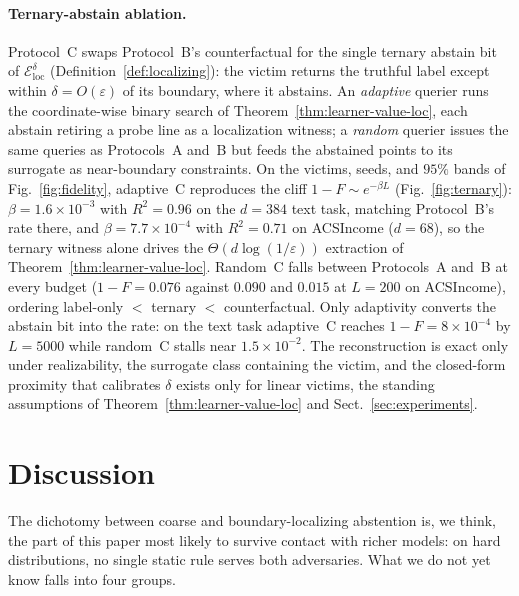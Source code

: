 \documentclass[runningheads,envcountsame]{llncs}
\newcommand{\cE}{\mathcal{E}}
\newcommand{\eps}{\varepsilon}
\begin{document}
\paragraph{Ternary-abstain ablation.} Protocol~C swaps Protocol~B's counterfactual for the single ternary abstain bit of $\cE_{\mathrm{loc}}^\delta$ (Definition~\ref{def:localizing}): the victim returns the truthful label except within $\delta = O(\eps)$ of its boundary, where it abstains. An \emph{adaptive} querier runs the coordinate-wise binary search of Theorem~\ref{thm:learner-value-loc}, each abstain retiring a probe line as a localization witness; a \emph{random} querier issues the same queries as Protocols~A and~B but feeds the abstained points to its surrogate as near-boundary constraints. On the victims, seeds, and $95\%$ bands of Fig.~\ref{fig:fidelity}, adaptive~C reproduces the cliff $1-F \sim e^{-\beta L}$ (Fig.~\ref{fig:ternary}): $\beta = 1.6 \times 10^{-3}$ with $R^2 = 0.96$ on the $d{=}384$ text task, matching Protocol~B's rate there, and $\beta = 7.7 \times 10^{-4}$ with $R^2 = 0.71$ on ACSIncome ($d{=}68$), so the ternary witness alone drives the $\Theta(d \log(1/\eps))$ extraction of Theorem~\ref{thm:learner-value-loc}. Random~C falls between Protocols~A and~B at every budget ($1-F = 0.076$ against $0.090$ and $0.015$ at $L = 200$ on ACSIncome), ordering label-only $<$ ternary $<$ counterfactual. Only adaptivity converts the abstain bit into the rate: on the text task adaptive~C reaches $1-F = 8 \times 10^{-4}$ by $L = 5000$ while random~C stalls near $1.5 \times 10^{-2}$. The reconstruction is exact only under realizability, the surrogate class containing the victim, and the closed-form proximity that calibrates $\delta$ exists only for linear victims, the standing assumptions of Theorem~\ref{thm:learner-value-loc} and Sect.~\ref{sec:experiments}.

\section{Discussion}
\label{sec:disc}

The dichotomy between coarse and boundary-localizing abstention is, we think, the part of this paper most likely to survive contact with richer models: on hard distributions, no single static rule serves both adversaries. What we do not yet know falls into four groups.
\end{document}
